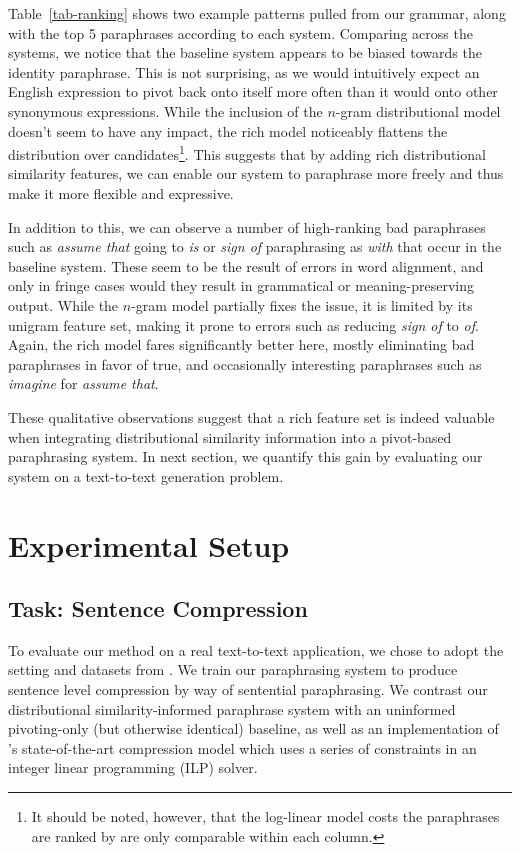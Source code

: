\documentclass[11pt]{article}
\begin{document}
Table~\ref{tab-ranking} shows two example patterns pulled from our
grammar, along with the top 5 paraphrases according to each
system. Comparing across the systems, we notice that the baseline
system appears to be biased towards the identity paraphrase. This is
not surprising, as we would intuitively expect an English expression
to pivot back onto itself more often than it would onto other
synonymous expressions. While the inclusion of the $n$-gram
distributional model doesn't seem to have any impact, the rich model
noticeably flattens the distribution over candidates\footnote{It
  should be noted, however, that the log-linear model costs the
  paraphrases are ranked by are only comparable within each
  column.}. This suggests that by adding rich distributional
similarity features, we can enable our system to paraphrase more
freely and thus make it more flexible and expressive.

In addition to this, we can observe a number of high-ranking bad
paraphrases such as \emph{assume that} going to \emph{is} or
\emph{sign of} paraphrasing as \emph{with} that occur in the baseline
system. These seem to be the result of errors in word alignment, and
only in fringe cases would they result in grammatical or
meaning-preserving output. While the $n$-gram model partially fixes
the issue, it is limited by its unigram feature set, making it prone
to errors such as reducing \emph{sign of} to \emph{of}. Again, the
rich model fares significantly better here, mostly eliminating bad
paraphrases in favor of true, and occasionally interesting paraphrases
such as \emph{imagine} for \emph{assume that}.

These qualitative observations suggest that a rich feature set is indeed valuable
when integrating distributional similarity information into a
pivot-based paraphrasing system. In next section, we quantify
this gain by evaluating our system on a text-to-text generation
problem.



\section{Experimental Setup}
\label{sec-setup}

\subsection{Task: Sentence Compression}

To evaluate our method on a real text-to-text application, we chose to
adopt the setting and datasets from \cite{Ganitkevitch2011}. We train
our paraphrasing system to produce sentence level compression by way
of sentential paraphrasing. We contrast our distributional
similarity-informed paraphrase system with an uninformed pivoting-only
(but otherwise identical) baseline, as well as an implementation of
's state-of-the-art compression model which uses a
series of constraints in an integer linear programming (ILP)
solver.
\end{document}
